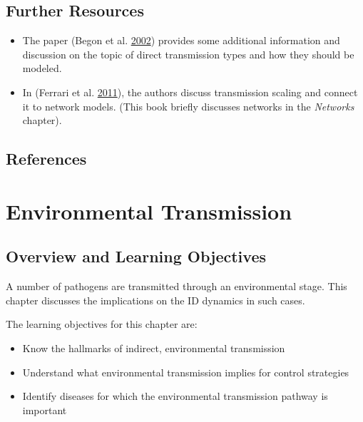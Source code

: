 \documentclass[
]{book}
\providecommand{\tightlist}{%
  \setlength{\itemsep}{0pt}\setlength{\parskip}{0pt}}
\begin{document}
\hypertarget{further-resources-5}{%
\section{Further Resources}\label{further-resources-5}}

\begin{itemize}
\tightlist
\item
  The paper (Begon et al. \protect\hyperlink{ref-begon02}{2002}) provides some additional information and discussion on the topic of direct transmission types and how they should be modeled.
\item
  In (Ferrari et al. \protect\hyperlink{ref-ferrari11}{2011}), the authors discuss transmission scaling and connect it to network models. (This book briefly discusses networks in the \emph{Networks } chapter).
\end{itemize}

\hypertarget{references-6}{%
\section{References}\label{references-6}}

\hypertarget{environmental-transmission-1}{%
\chapter{Environmental Transmission}\label{environmental-transmission-1}}

\hypertarget{overview-and-learning-objectives-6}{%
\section{Overview and Learning Objectives}\label{overview-and-learning-objectives-6}}

A number of pathogens are transmitted through an environmental stage. This chapter discusses the implications on the ID dynamics in such cases.

The learning objectives for this chapter are:

\begin{itemize}
\tightlist
\item
  Know the hallmarks of indirect, environmental transmission
\item
  Understand what environmental transmission implies for control strategies
\item
  Identify diseases for which the environmental transmission pathway is important
\end{itemize}
\end{document}
